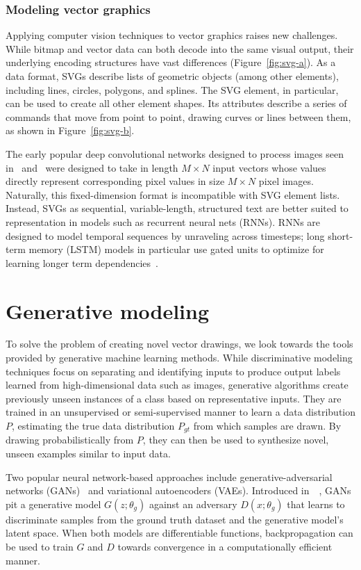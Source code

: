 \subsubsection{Modeling vector graphics}
Applying computer vision techniques to vector graphics raises new challenges.
While bitmap and vector data can both decode into the same visual output, their underlying encoding structures have vast differences (Figure~\ref{fig:svg-a}).
As a data format, SVGs describe lists of geometric objects (among other elements), including lines, circles, polygons, and splines.
The SVG  element, in particular, can be used to create all other element shapes.
Its attributes describe a series of commands that move from point to point, drawing curves or lines between them, as shown in Figure~\ref{fig:svg-b}.

The early popular deep convolutional networks designed to process images seen in~\cite{krizhevsky2012imagenet} and~\cite{simonyan2014very} were designed to take in length $M\times N$ input vectors whose values directly represent corresponding pixel values in size $M\times N$ pixel images.
Naturally, this fixed-dimension format is incompatible with SVG element lists.
Instead, SVGs as sequential, variable-length, structured text are better suited to representation in models such as recurrent neural nets (RNNs).
RNNs are designed to model temporal sequences by unraveling across timesteps; long short-term memory (LSTM) models in particular use gated units to optimize for learning longer term dependencies~\cite{hochreiter1997long}.

\section{Generative modeling}
To solve the problem of creating novel vector drawings, we look towards the tools provided by generative machine learning methods.
While discriminative modeling techniques focus on separating and identifying inputs to produce output labels learned from high-dimensional data such as images, generative algorithms create previously unseen instances of a class based on representative inputs.
They are trained in an unsupervised or semi-supervised manner to learn a data distribution $P$, estimating the true data distribution $P_{gt}$ from which samples are drawn.
By drawing probabilistically from $P$, they can then be used to synthesize novel, unseen examples similar to input data.

Two popular neural network-based approaches include generative-adversarial networks (GANs)~\cite{karpathy2016generative} and variational autoencoders (VAEs).
Introduced in~\citeyear{goodfellow2014generative}~\cite{goodfellow2014generative}, GANs pit a generative model $G(z; \theta_g)$ against an adversary $D(x; \theta_g)$ that learns to discriminate samples from the ground truth dataset and the generative model's latent space.
When both models are differentiable functions, backpropagation can be used to train $G$ and $D$ towards convergence in a computationally efficient manner.

